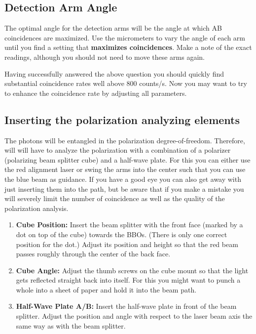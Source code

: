 \documentclass{../lab}
\begin{document}
\subsection{Detection Arm Angle}

The optimal angle for the detection arms will be the angle at which AB coincidences are maximized. Use the micrometers to vary the angle of each arm until you find a setting that \textbf{maximizes coincidences}. Make a note of the exact readings, although you should not need to move these arms again.


Having successfully answered the above question you should quickly find substantial coincidence rates well above 800 counts/s. Now you may want to try to enhance the coincidence rate by adjusting all parameters.

\subsection{Inserting the polarization analyzing elements}

The photons will be entangled in the polarization degree-of-freedom. Therefore, will will have to analyze the polarization with a combination of a polarizer (polarizing beam splitter cube) and a half-wave plate. For this you can either use the red alignment laser or swing the arms into the center such that you can use the blue beam as guidance. If you have a good eye you can also get away with just inserting them into the path, but be aware that if you make a mistake you will severely limit the number of coincidence as well as the quality of the polarization analysis.

\begin{enumerate}
    \item \textbf{Cube Position:} Insert the beam splitter with the front face (marked by a dot on top of the cube) towards the BBOs. (There is only one correct position for the dot.) Adjust its position and height so that the red beam passes roughly through the center of the back face.

    \item \textbf{Cube Angle:} Adjust the thumb screws on the cube mount so that the light gets reflected straight back into itself. For this you might want to punch a whole into a sheet of paper and hold it into the beam path.

    \item \textbf{Half-Wave Plate A/B:} Insert the half-wave plate in front of the beam splitter. Adjust the position and angle with respect to the laser beam axis the same way as with the beam splitter.
\end{enumerate}
\end{document}
